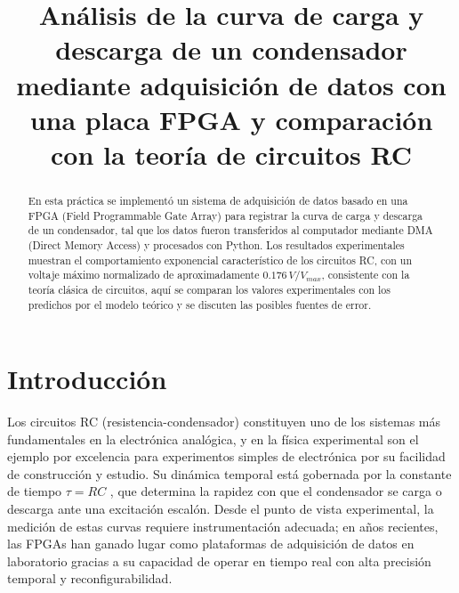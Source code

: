 \documentclass[conference]{IEEEtran}
\begin{document}
\title{Análisis de la curva de carga y descarga de un condensador mediante adquisición de datos con una placa FPGA y comparación con la teoría de circuitos RC}

\author{
}

\maketitle

\begin{abstract}
En esta práctica se implementó un sistema de adquisición de datos basado en una FPGA (Field Programmable Gate Array) para registrar la curva de carga y descarga de un condensador, tal que los datos fueron transferidos al computador mediante DMA (Direct Memory Access) y procesados con Python. Los resultados experimentales muestran el comportamiento exponencial característico de los circuitos RC, con un voltaje máximo normalizado de aproximadamente $0.176\,V/V_{max}$, consistente con la teoría clásica de circuitos, aquí se comparan los valores experimentales con los predichos por el modelo teórico y se discuten las posibles fuentes de error.
\end{abstract}

\section{Introducción}

Los circuitos RC (resistencia-condensador) constituyen uno de los sistemas más fundamentales en la electrónica analógica, y en la física experimental son el ejemplo por excelencia para experimentos simples de electrónica por su facilidad de construcción y estudio. Su dinámica temporal está gobernada por la constante de tiempo $\tau = RC$ \cite[p.~274, eq.~(16)]{hayt2012}, que determina la rapidez con que el condensador se carga o descarga ante una excitación escalón. Desde el punto de vista experimental, la medición de estas curvas requiere instrumentación adecuada; en años recientes, las FPGAs han ganado lugar como plataformas de adquisición de datos en laboratorio gracias a su capacidad de operar en tiempo real con alta precisión temporal y reconfigurabilidad.
\end{document}
